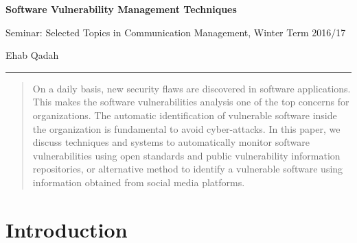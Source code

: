 \documentclass{llncs}
\begin{document}
\begin{flushleft}
 
 \thispagestyle{empty}
\centering\LARGE {\bf Software Vulnerability Management Techniques}




\vspace{2pt}


\centering
 Seminar: Selected Topics in Communication Management,
 Winter Term 2016/17



\centering
 Ehab Qadah\\
\rule{\textwidth}{1pt}



 

\end{flushleft}




\begin{abstract}
On a daily basis, new security flaws are discovered in software applications. This makes the software vulnerabilities analysis one of the top concerns for organizations. The automatic identification of vulnerable software inside the organization is fundamental to avoid cyber-attacks. In this paper, we discuss techniques and systems to automatically monitor software vulnerabilities using open standards and public vulnerability information repositories, or alternative method to identify a vulnerable software using information obtained from social media platforms. 
\end{abstract}

\section{Introduction}
\end{document}
